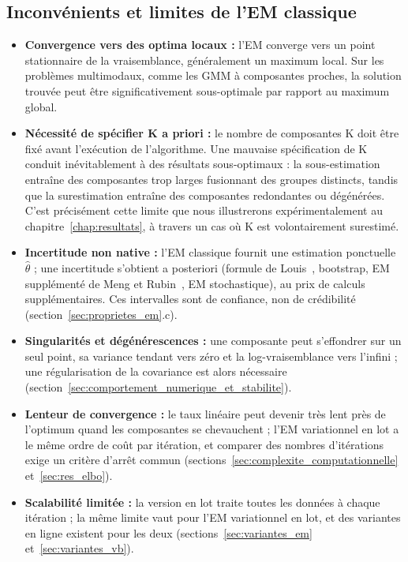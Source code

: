 \subsection{Inconvénients et limites de l'EM classique}\label{sec:inconvenients_et_limites_de_l}
\begin{itemize}
\item \textbf{Convergence vers des optima locaux : }l'EM converge vers un point stationnaire de la vraisemblance, généralement un maximum local. Sur les problèmes multimodaux, comme les GMM à composantes proches, la solution trouvée peut être significativement sous-optimale par rapport au maximum global.
\item \textbf{Nécessité de spécifier K a priori : }le nombre de composantes K doit être fixé avant l'exécution de l'algorithme. Une mauvaise spécification de K conduit inévitablement à des résultats sous-optimaux : la sous-estimation entraîne des composantes trop larges fusionnant des groupes distincts, tandis que la surestimation entraîne des composantes redondantes ou dégénérées. C'est précisément cette limite que nous illustrerons expérimentalement au chapitre~\ref{chap:resultats}, à travers un cas où K est volontairement surestimé.
\item \textbf{Incertitude non native : }l'EM classique fournit une estimation ponctuelle $\hat{\theta}$ ; une incertitude s'obtient a posteriori (formule de Louis~\cite{louis1982}, bootstrap, EM supplémenté de Meng et Rubin~\cite{meng1991}, EM stochastique), au prix de calculs supplémentaires. Ces intervalles sont de confiance, non de crédibilité (section~\ref{sec:proprietes_em}.c).
\item \textbf{Singularités et dégénérescences : }une composante peut s'effondrer sur un seul point, sa variance tendant vers zéro et la log-vraisemblance vers l'infini ; une régularisation de la covariance est alors nécessaire (section~\ref{sec:comportement_numerique_et_stabilite}).
\item \textbf{Lenteur de convergence : }le taux linéaire peut devenir très lent près de l'optimum quand les composantes se chevauchent ; l'EM variationnel en lot a le même ordre de coût par itération, et comparer des nombres d'itérations exige un critère d'arrêt commun (sections~\ref{sec:complexite_computationnelle} et~\ref{sec:res_elbo}).
\item \textbf{Scalabilité limitée : }la version en lot traite toutes les données à chaque itération ; la même limite vaut pour l'EM variationnel en lot, et des variantes en ligne existent pour les deux (sections~\ref{sec:variantes_em} et~\ref{sec:variantes_vb}).
\end{itemize}
